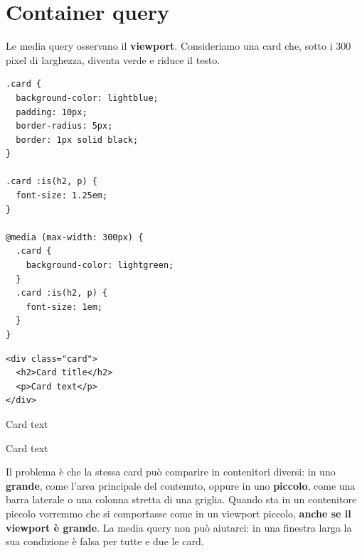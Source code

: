 \section{Container query}

Le media query osservano il \textbf{viewport}. Consideriamo una card che, sotto
i 300 pixel di larghezza, diventa verde e riduce il testo.

\begin{affianco}[0.5][c]
\begin{lstlisting}[style=css, name=card.css]
.card {
  background-color: lightblue;
  padding: 10px;
  border-radius: 5px;
  border: 1px solid black;
}

.card :is(h2, p) {
  font-size: 1.25em;
}

@media (max-width: 300px) {
  .card {
    background-color: lightgreen;
  }
  .card :is(h2, p) {
    font-size: 1em;
  }
}
\end{lstlisting}
\begin{lstlisting}[style=html, name=card.html]
<div class="card">
  <h2>Card title</h2>
  <p>Card text</p>
</div>
\end{lstlisting}
\risultato
\begin{browser}
  \noindent\colorbox{css-lightblue}{\parbox{\dimexpr\linewidth-2\fboxsep}{%
    \vspace{2pt}{\bfseries\Large Card title}\par\vspace{6pt}
    {\large Card text}\vspace{2pt}}}
\end{browser}
\begin{minipage}{4.2cm}
\begin{browser}[sotto i 300px]
  \noindent\colorbox{css-lightgreen}{\parbox{\dimexpr\linewidth-2\fboxsep}{%
    \vspace{2pt}{\bfseries\normalsize Card title}\par\vspace{4pt}
    {\small Card text}\vspace{2pt}}}
\end{browser}
\end{minipage}
\end{affianco}

Il problema è che la stessa card può comparire in contenitori diversi: in uno
\textbf{grande}, come l'area principale del contenuto, oppure in uno
\textbf{piccolo}, come una barra laterale o una colonna stretta di una griglia.
Quando sta in un contenitore piccolo vorremmo che si comportasse come in un
viewport piccolo, \textbf{anche se il viewport è grande}. La media query non
può aiutarci: in una finestra larga la sua condizione è falsa per tutte e due
le card.

